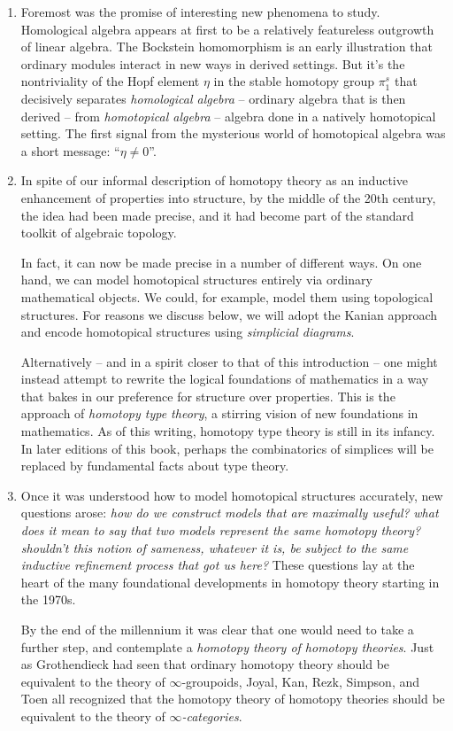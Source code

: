 \begin{enumerate}
  \item%
    Foremost was the promise of interesting new phenomena to study.
    Homological algebra appears at first to be a relatively featureless outgrowth of linear algebra.
    The Bockstein homomorphism is an early illustration that ordinary modules interact in new ways in derived settings.
    But it's the nontriviality of the Hopf element $\eta$ in the stable homotopy group $\pi^s_1$ that decisively separates \emph{homological algebra} -- ordinary algebra that is then derived -- from \emph{homotopical algebra} -- algebra done in a natively homotopical setting.
    The first signal from the mysterious world of homotopical algebra was a short message: \enquote{$\eta \neq 0$}.
  \item%
    In spite of our informal description of homotopy theory as an inductive enhancement of properties into structure,
    by the middle of the 20th century, the idea had been made precise, and
    it had become part of the standard toolkit of algebraic topology.

    In fact, it can now be made precise in a number of different ways.
    On one hand, we can model homotopical structures entirely via ordinary mathematical objects.
    We could, for example, model them using topological structures.
    For reasons we discuss below, we will adopt the Kanian approach and encode homotopical structures using \emph{simplicial diagrams}.

    Alternatively -- and in a spirit closer to that of this introduction -- one might instead attempt to rewrite the logical foundations of mathematics in a way that bakes in our preference for structure over properties.
    This is the approach of \emph{homotopy type theory}, a stirring vision of new foundations in mathematics.
    As of this writing, homotopy type theory is still in its infancy.
    In later editions of this book, perhaps the combinatorics of simplices will be replaced by fundamental facts about type theory.
  \item%
    Once it was understood how to model homotopical structures accurately, new questions arose:
    \emph{how do we construct models that are maximally useful?}
    \emph{what does it mean to say that two models represent the same homotopy theory?}
    \emph{shouldn't this notion of sameness, whatever it is, be subject to the same inductive refinement process that got us here?}
    These questions lay at the heart of the many foundational developments in homotopy theory starting in the 1970s.

    By the end of the millennium it was clear that one would need to take a further step, and contemplate a \emph{homotopy theory of homotopy theories}.
    Just as Grothendieck had seen that ordinary homotopy theory should be equivalent to the theory of $\infty$-groupoids,
    Joyal, Kan, Rezk, Simpson, and Toen all recognized that the homotopy theory of homotopy theories should be equivalent to the theory of \emph{$\infty$-categories}.
\end{enumerate}


